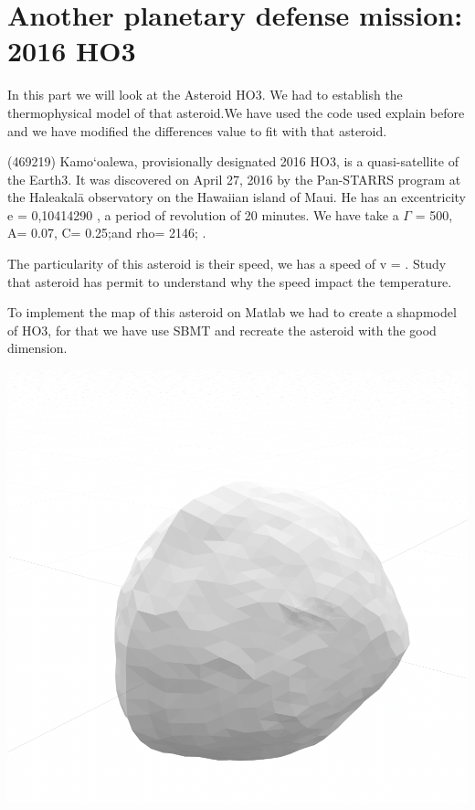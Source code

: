 \section{Another planetary defense mission: 2016 HO3}
\label{HO3}

In this part we will look at the Asteroid HO3. We had to establish the thermophysical model of that asteroid.We have used the code used explain before and we have modified the differences value to fit with that asteroid.\newline

(469219) Kamo‘oalewa, provisionally designated 2016 HO3, is a quasi-satellite of the Earth3. It was discovered on April 27, 2016 by the Pan-STARRS program at the Haleakalā observatory on the Hawaiian island of Maui.\newline
He has an excentricity e = 0,10414290 , a period of revolution of 20 minutes. We have take a $\Gamma$ = 500, A= 0.07, C= 0.25;and rho= 2146; .\newline

The particularity of this asteroid is their speed, we has a speed of v = . Study that asteroid has permit to understand why the speed impact the temperature.

To implement the map of this asteroid on Matlab we had to create a shapmodel of HO3, for that we have use SBMT and recreate the asteroid with the good dimension.\newline 
\begin{center}
    \captionsetup{type=figure}
    \includegraphics[scale=0.4]{rsc/HO3_shapemodel.png}
\end{center}

